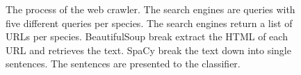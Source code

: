 \documentclass[a4paper, 12pt, oneside]{book} %
\begin{document}
\begin{figure} [t]
    \centering
    \caption[Web Crawler]{The process of the web crawler. The search engines are queries with five different queries per species. The search engines return a list of URLs per species. BeautifulSoup break extract the HTML of each URL and retrieves the text. SpaCy break the text down into single sentences. The sentences are presented to the classifier.}
    \label{fig:webcrawler}
\end{figure}
\end{document}
